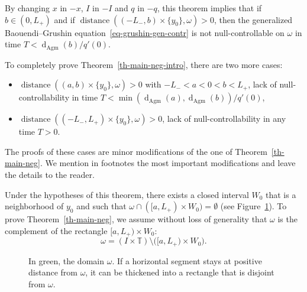 \documentclass[AHL,Unicode,longabstracts,published]{cedram}
\newcommand{\1}{\mathds 1}
\DeclareMathOperator{\distance}{distance}
\newcommand{\dagmon}{\mathop{\mathrm{d}}\nolimits_{\mathrm{Agm}}}
\newcommand{\T}{\mathbb{T}}
\renewcommand{\o}{\omega}
\renewcommand{\o}{\omega}
\begin{document}
\begin{rema}\label{rk-main-neg}
By changing $x$ in $-x$, $I$ in $-I$ and $q$ in $-q$, this theorem implies that if $b\in(0,L_+)$ and if $\distance((-L_-,b)\times \{y_0\}, \o) > 0$, then the generalized Baouendi--Grushin equation~\eqref{eq-grushin-gen-contr} is not null-controllable on $\o$ in time $T< \dagmon(b)/q'(0)$.

To completely prove Theorem~\ref{th-main-neg-intro}, there are two more cases:
\begin{itemize}
\item $\distance((a,b)\times\{y_0\}, \o)>0$ with $-L_-< a <0<b<L_+$, lack of null-controllability in time $T< \min(\dagmon(a),\dagmon(b))/q'(0)$,
\item $\distance((-L_-,L_+)\times\{y_0\}, \o)>0$, lack of null-controllability in any time $T>0$.
\end{itemize}
The proofs of these cases are minor modifications of the one of Theorem~\ref{th-main-neg}. We mention in footnotes the most important modifications and leave the details to the reader.
\end{rema}

Under the hypotheses of this theorem, there exists a closed interval $W_0$ that is a neighborhood of $y_0$ and such that $\o \cap ([a,L_+)\times W_0) = \emptyset$ (see Figure~\ref{fig:omega_neg}). To prove Theorem~\ref{th-main-neg}, we assume without loss of generality that $\o$ is the complement of the rectangle $[a,L_+)\times W_0$:
\begin{equation}\label{eq-def-omega}
\o = (I\times \T)\setminus \big([a,L_+)\times W_0\big).
\end{equation}

\begin{figure}[ht]
\centering
{}
\vspace*{-8pt}
\caption{In green, the domain $\omega$. If a horizontal segment stays at positive distance from $\omega$, it can be thickened into a rectangle that is disjoint from $\omega$.}\label{fig:omega_neg}
\end{figure}
\end{document}
